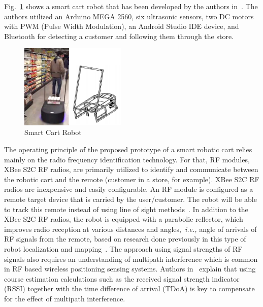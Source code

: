\documentclass[conference]{IEEEtran}
\begin{document}
%
Fig.~\ref{fig:SmartCart} shows a smart cart robot that has been developed by the authors in~\cite{Rawashdeh2017-Person}. The authors utilized an Arduino MEGA 2560, six
ultrasonic sensors, two DC motors with PWM (Pulse Width Modulation), an Android
Studio IDE device, and Bluetooth for detecting a customer and following them
through the store. %
%
\begin{figure}[htpb]
   \centering
   \includegraphics[width=0.45\textwidth]{figs/img/SmartCart}
   \caption{Smart Cart Robot}
   \label{fig:SmartCart}
\end{figure}
%
The operating principle of the proposed prototype of a smart robotic cart relies mainly on the radio frequency identification technology. For that, RF modules, XBee S2C RF radios, are primarily utilized to identify and communicate between the robotic cart and the remote (customer in a store, for example). XBee S2C RF radios are inexpensive and easily configurable. An RF module is configured as a remote target device that is carried
by the user/customer. The robot will be able to track this remote instead of using line
of sight methods~\cite{Miah2018-Intelligent}. In addition to the XBee S2C RF
radios, the robot is equipped with a parabolic reflector, which improves radio
reception at various distances and angles,~\textit{i.e.,} angle of arrivals of
RF signals from the remote, based on research done previously in this type of
robot localization and mapping~\cite{Miah2018-Intelligent,Li2013ANA}. The approach using signal strengths of RF signals also requires an understanding
of multipath interference which is common in RF based wireless positioning
sensing systems. Authors in~\cite{xie_jiang_zhao_zhang_2019} explain that using
course estimation calculations such as the received signal strength indicator (RSSI)
 together with the time difference of arrival (TDoA) is key to compensate for the effect of multipath
interference. 
\end{document}
